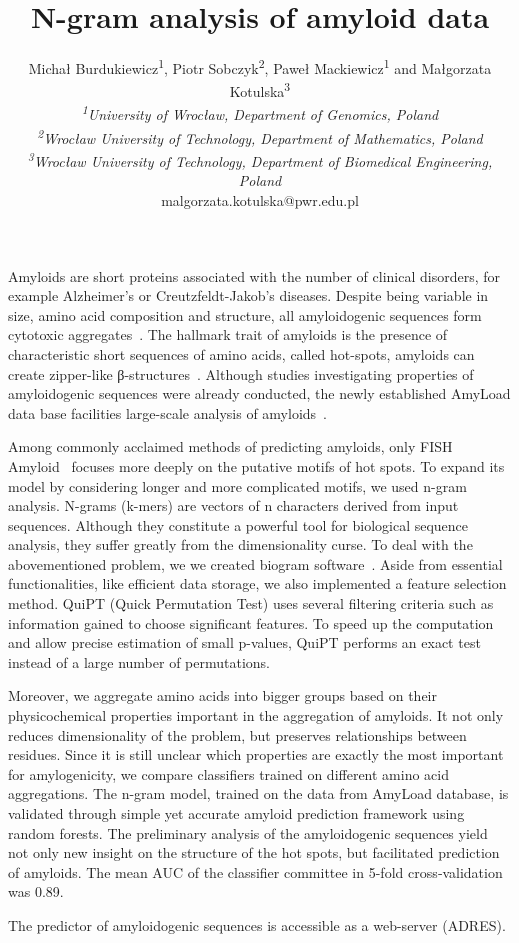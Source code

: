 \documentclass[english]{gcb15abstract}
\title{N-gram analysis of amyloid data}
\author{
Micha\l{} Burdukiewicz\textsuperscript{1}, Piotr Sobczyk\textsuperscript{2}, Pawe\l{} Mackiewicz\textsuperscript{1} and Ma\l{}gorzata Kotulska\textsuperscript{3} \\
{\normalsize\normalfont\itshape \textsuperscript{1}University of Wroc\l{}aw, Department of Genomics, Poland}\\
{\normalsize\normalfont\itshape \textsuperscript{2}Wroc\l{}aw University of Technology, Department of Mathematics, Poland}\\
{\normalsize\normalfont\itshape \textsuperscript{3}Wroc\l{}aw University of Technology, Department of Biomedical Engineering, Poland}\\
malgorzata.kotulska@pwr.edu.pl
}
\begin{document}
\maketitle 

Amyloids are short proteins associated with the number of clinical disorders, for example Alzheimer's or Creutzfeldt-Jakob’s diseases. Despite being variable in size, amino acid composition and structure, all amyloidogenic sequences form cytotoxic aggregates~\cite{breydo_structural_2015}. The hallmark trait of amyloids is the presence of characteristic short sequences of amino acids, called hot-spots, amyloids can create zipper-like β-structures~\cite{fandrich_oligomeric_2012}. Although studies investigating properties of amyloidogenic sequences were already conducted, the newly established AmyLoad data base facilities large-scale analysis of amyloids~\cite{wozniak_amyload:_2015}.

Among commonly acclaimed methods of predicting amyloids, only FISH Amyloid~\cite{gasior_fish_2014} focuses more deeply on the putative motifs of hot spots. To expand its model by considering longer and more complicated motifs, we used n-gram analysis. N-grams (k-mers) are vectors of n characters derived from input sequences. Although they constitute a powerful tool for biological sequence analysis, they suffer greatly from the dimensionality curse. To deal with the abovementioned problem, we we created biogram software~\cite{biogram2015}. Aside from essential  functionalities, like efficient data storage, we also implemented a feature selection method. QuiPT (Quick Permutation Test) uses several filtering criteria such as information gained to choose significant features. To speed up the computation and allow precise estimation of small p-values, QuiPT performs an exact test instead of a large number of permutations. 

Moreover, we aggregate amino acids into bigger groups based on their physicochemical properties important in the aggregation of amyloids. It not only reduces dimensionality of the problem, but preserves relationships between residues. Since it is still unclear which properties are exactly the most important for amylogenicity, we compare classifiers trained on different amino acid aggregations.
The n-gram model, trained on the data from AmyLoad database, is validated through simple yet accurate amyloid prediction framework using random forests. The preliminary analysis of the amyloidogenic sequences yield not only new insight on the structure of the hot spots, but facilitated prediction of amyloids. The mean AUC of the classifier committee in 5-fold cross‑validation was 0.89.

The predictor of amyloidogenic sequences is accessible as a web-server (ADRES).



\end{document}
